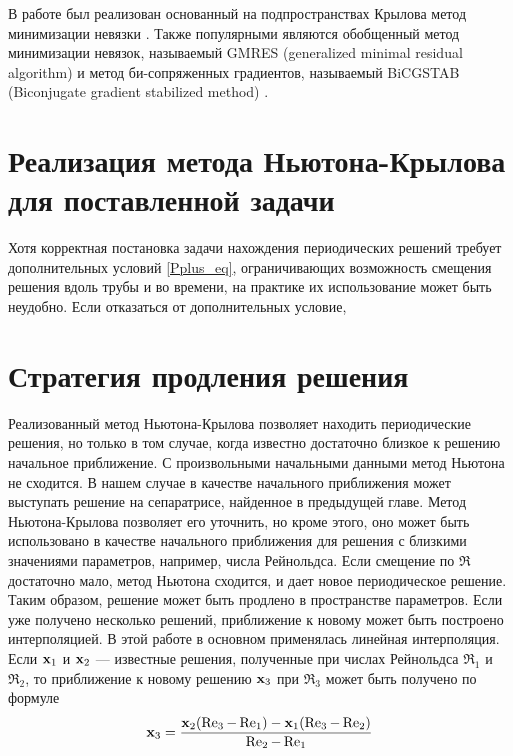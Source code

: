 В работе был реализован основанный на подпространствах Крылова метод минимизации невязки \cite{Tirtishnikov}. Также популярными являются обобщенный метод минимизации невязок, называемый GMRES (generalized minimal residual algorithm) \cite{} и метод би-сопряженных градиентов, называемый BiCGSTAB (Biconjugate gradient stabilized method) \cite{Sleijpen1993}. 


\section{Реализация метода Ньютона-Крылова для поставленной задачи}

Хотя корректная постановка задачи нахождения периодических решений требует дополнительных условий \eqref{Pplus_eq}, ограничивающих возможность смещения решения вдоль трубы и во времени, на практике их использование может быть неудобно. Если отказаться от дополнительных условие,


\section{Стратегия продления решения}

Реализованный метод Ньютона-Крылова позволяет находить периодические решения, но только в том случае, когда известно достаточно близкое к решению начальное приближение. С произвольными начальными данными метод Ньютона не сходится. В нашем случае в качестве начального приближения может выступать решение на сепаратрисе, найденное в предыдущей главе. Метод Ньютона-Крылова позволяет его уточнить, но кроме этого, оно может быть использовано в качестве начального приближения для решения с близкими значениями параметров, например, числа Рейнольдса. Если смещение по $\Re$ достаточно мало, метод Ньютона сходится, и дает новое периодическое решение. Таким образом, решение может быть продлено в пространстве параметров. Если уже получено несколько решений, приближение к новому может быть построено интерполяцией. В этой работе в основном применялась линейная интерполяция. Если $\mathbf{x}_1$ и $\mathbf{x}_2$ --- известные решения, полученные при числах Рейнольдса $\Re_1$ и $\Re_2$, то приближение к новому решению $\mathbf{x}_3$ при $\Re_3$ может быть получено по формуле 
\begin{equation}
\mathbf{x}_3 = \frac{\mathbf{x}_2(\operatorname{Re}_3 - \operatorname{Re}_1) - \mathbf{x}_1(\operatorname{Re}_3-\operatorname{Re}_2)}{\operatorname{Re}_2 - \operatorname{Re}_1}
\end{equation}

